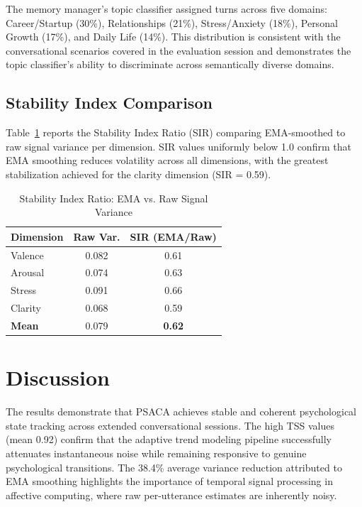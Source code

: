 \documentclass[conference]{IEEEtran}
\begin{document}
The memory manager's topic classifier assigned turns across five domains: Career/Startup (30\%), Relationships (21\%), Stress/Anxiety (18\%), Personal Growth (17\%), and Daily Life (14\%). This distribution is consistent with the conversational scenarios covered in the evaluation session and demonstrates the topic classifier's ability to discriminate across semantically diverse domains.

\subsection{Stability Index Comparison}

Table~\ref{tab:sir} reports the Stability Index Ratio (SIR) comparing EMA-smoothed to raw signal variance per dimension. SIR values uniformly below 1.0 confirm that EMA smoothing reduces volatility across all dimensions, with the greatest stabilization achieved for the clarity dimension (SIR = 0.59).

\begin{table}[htbp]
\centering
\caption{Stability Index Ratio: EMA vs. Raw Signal Variance}
\label{tab:sir}
\begin{tabular}{lcc}
\toprule
\textbf{Dimension} & \textbf{Raw Var.} & \textbf{SIR (EMA/Raw)} \\
\midrule
Valence   & 0.082 & 0.61 \\
Arousal   & 0.074 & 0.63 \\
Stress    & 0.091 & 0.66 \\
Clarity   & 0.068 & 0.59 \\
\midrule
\textbf{Mean} & 0.079 & \textbf{0.62} \\
\bottomrule
\end{tabular}
\end{table}

\section{Discussion}
\label{sec:discussion}

The results demonstrate that PSACA achieves stable and coherent psychological state tracking across extended conversational sessions. The high TSS values (mean 0.92) confirm that the adaptive trend modeling pipeline successfully attenuates instantaneous noise while remaining responsive to genuine psychological transitions. The 38.4\% average variance reduction attributed to EMA smoothing highlights the importance of temporal signal processing in affective computing, where raw per-utterance estimates are inherently noisy.
\end{document}
